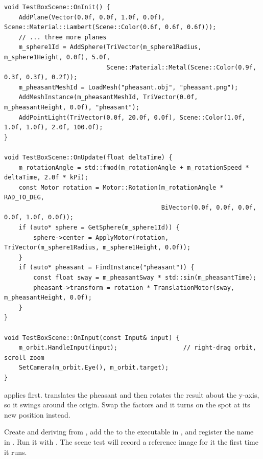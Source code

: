 \documentclass[11pt,a4paper]{article}
\begin{document}
\begin{lstlisting}
void TestBoxScene::OnInit() {
    AddPlane(Vector(0.0f, 0.0f, 1.0f, 0.0f), Scene::Material::Lambert(Scene::Color(0.6f, 0.6f, 0.6f)));
    // ... three more planes
    m_sphere1Id = AddSphere(TriVector(m_sphere1Radius, m_sphere1Height, 0.0f), 5.0f,
                            Scene::Material::Metal(Scene::Color(0.9f, 0.3f, 0.3f), 0.2f));
    m_pheasantMeshId = LoadMesh("pheasant.obj", "pheasant.png");
    AddMeshInstance(m_pheasantMeshId, TriVector(0.0f, m_pheasantHeight, 0.0f), "pheasant");
    AddPointLight(TriVector(0.0f, 20.0f, 0.0f), Scene::Color(1.0f, 1.0f, 1.0f), 2.0f, 100.0f);
}

void TestBoxScene::OnUpdate(float deltaTime) {
    m_rotationAngle = std::fmod(m_rotationAngle + m_rotationSpeed * deltaTime, 2.0f * kPi);
    const Motor rotation = Motor::Rotation(m_rotationAngle * RAD_TO_DEG,
                                           BiVector(0.0f, 0.0f, 0.0f, 0.0f, 1.0f, 0.0f));
    if (auto* sphere = GetSphere(m_sphere1Id)) {
        sphere->center = ApplyMotor(rotation, TriVector(m_sphere1Radius, m_sphere1Height, 0.0f));
    }
    if (auto* pheasant = FindInstance("pheasant")) {
        const float sway = m_pheasantSway * std::sin(m_pheasantTime);
        pheasant->transform = rotation * TranslationMotor(sway, m_pheasantHeight, 0.0f);
    }
}

void TestBoxScene::OnInput(const Input& input) {
    m_orbit.HandleInput(input);                  // right-drag orbit, scroll zoom
    SetCamera(m_orbit.Eye(), m_orbit.target);
}
\end{lstlisting}

\begin{pitfall}
 applies  first.  translates the pheasant and then rotates the result about the y-axis, so it swings around the origin. Swap the factors and it turns on the spot at its new position instead.
\end{pitfall}

\begin{tryit}
Create  and  deriving from , add the  to the executable in , and register the name in . Run it with . The scene test will record a reference image for it the first time it runs.
\end{tryit}
\end{document}
